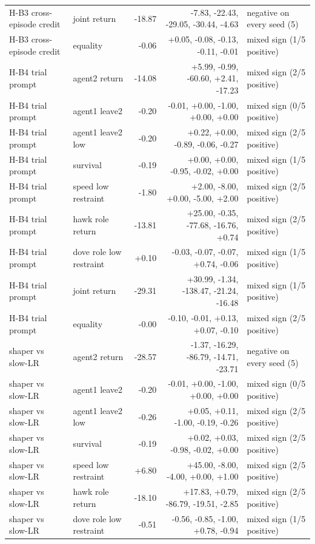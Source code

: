 \begin{tabular}{llrrl}
H-B3 cross-episode credit & joint return & -18.87 & -7.83, -22.43, -29.05, -30.44, -4.63 & negative on every seed (5) \\
H-B3 cross-episode credit & equality & -0.06 & +0.05, -0.08, -0.13, -0.11, -0.01 & mixed sign (1/5 positive) \\
H-B4 trial prompt & agent2 return & -14.08 & +5.99, -0.99, -60.60, +2.41, -17.23 & mixed sign (2/5 positive) \\
H-B4 trial prompt & agent1 leave2 & -0.20 & -0.01, +0.00, -1.00, +0.00, +0.00 & mixed sign (0/5 positive) \\
H-B4 trial prompt & agent1 leave2 low & -0.20 & +0.22, +0.00, -0.89, -0.06, -0.27 & mixed sign (2/5 positive) \\
H-B4 trial prompt & survival & -0.19 & +0.00, +0.00, -0.95, -0.02, +0.00 & mixed sign (1/5 positive) \\
H-B4 trial prompt & speed low restraint & -1.80 & +2.00, -8.00, +0.00, -5.00, +2.00 & mixed sign (2/5 positive) \\
H-B4 trial prompt & hawk role return & -13.81 & +25.00, -0.35, -77.68, -16.76, +0.74 & mixed sign (2/5 positive) \\
H-B4 trial prompt & dove role low restraint & +0.10 & -0.03, -0.07, -0.07, +0.74, -0.06 & mixed sign (1/5 positive) \\
H-B4 trial prompt & joint return & -29.31 & +30.99, -1.34, -138.47, -21.24, -16.48 & mixed sign (1/5 positive) \\
H-B4 trial prompt & equality & -0.00 & -0.10, -0.01, +0.13, +0.07, -0.10 & mixed sign (2/5 positive) \\
shaper vs slow-LR & agent2 return & -28.57 & -1.37, -16.29, -86.79, -14.71, -23.71 & negative on every seed (5) \\
shaper vs slow-LR & agent1 leave2 & -0.20 & -0.01, +0.00, -1.00, +0.00, +0.00 & mixed sign (0/5 positive) \\
shaper vs slow-LR & agent1 leave2 low & -0.26 & +0.05, +0.11, -1.00, -0.19, -0.26 & mixed sign (2/5 positive) \\
shaper vs slow-LR & survival & -0.19 & +0.02, +0.03, -0.98, -0.02, +0.00 & mixed sign (2/5 positive) \\
shaper vs slow-LR & speed low restraint & +6.80 & +45.00, -8.00, -4.00, +0.00, +1.00 & mixed sign (2/5 positive) \\
shaper vs slow-LR & hawk role return & -18.10 & +17.83, +0.79, -86.79, -19.51, -2.85 & mixed sign (2/5 positive) \\
shaper vs slow-LR & dove role low restraint & -0.51 & -0.56, -0.85, -1.00, +0.78, -0.94 & mixed sign (1/5 positive) \\

\end{tabular}
